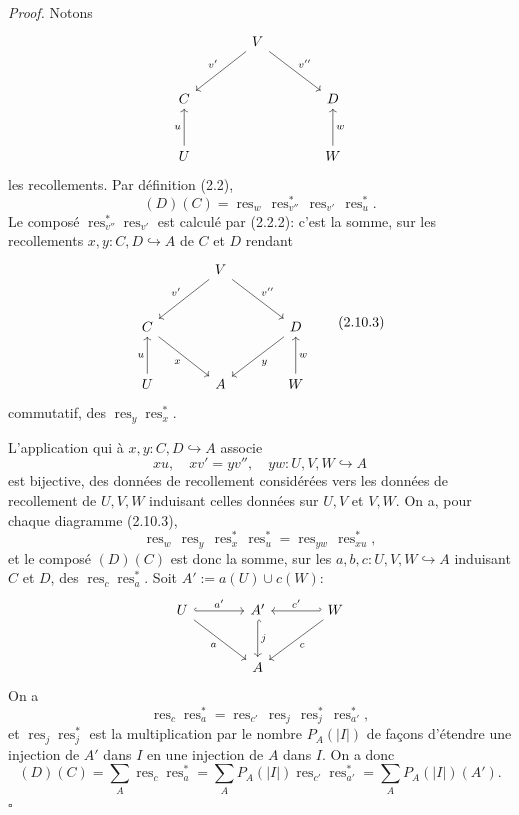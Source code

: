 \documentclass[11pt]{article}
\newcommand{\res}{\operatorname{res}}
\theoremstyle{deligne}
\newenvironment{proofdel}{\textit{Proof.}}{\hfill$\square$}
\begin{document}
\begin{proofdel}
Notons
\[
\begin{tikzcd}[column sep=large,row sep=large]
& V \arrow[dl,"v'"'] \arrow[dr,"v''"] &\\
C && D\\
U \arrow[u,"u"] && W \arrow[u,"w"']
\end{tikzcd}
\]
les recollements. Par définition (2.2),
\[
  (D)(C)=\res_w\,\res_{v''}^*\,\res_{v'}\,\res_u^*.
\]
Le composé \(\res_{v''}^*\res_{v'}\) est calculé par (2.2.2): c'est la somme, sur les recollements \(x,y:C,D\hookrightarrow A\) de \(C\) et \(D\) rendant
\[
\begin{tikzcd}[column sep=large,row sep=large]
& V \arrow[dl,"v'"'] \arrow[dr,"v''"] &\\
C \arrow[dr,"x"'] && D \arrow[dl,"y"]\\
U \arrow[u,"u"] & A & W \arrow[u,"w"']
\end{tikzcd}
\tag{2.10.3}
\]
commutatif, des \(\res_y\res_x^*\).

L'application qui à \(x,y:C,D\hookrightarrow A\) associe
\[
  xu,\quad xv'=yv'',\quad yw:U,V,W\hookrightarrow A
\]
est bijective, des données de recollement considérées vers les données de recollement de \(U,V,W\) induisant celles données sur \(U,V\) et \(V,W\). On a, pour chaque diagramme (2.10.3),
\[
  \res_w\,\res_y\,\res_x^*\,\res_u^*=\res_{yw}\,\res_{xu}^*,
\]
et le composé \((D)(C)\) est donc la somme, sur les \(a,b,c:U,V,W\hookrightarrow A\) induisant \(C\) et \(D\), des \(\res_c\res_a^*\). Soit \(A':=a(U)\cup c(W)\):
\[
\begin{tikzcd}[column sep=large,row sep=large]
U \arrow[r,hook,"a'"] \arrow[dr,"a"'] &
A' \arrow[d,hook,"j"] &
W \arrow[l,hook',"c'"'] \arrow[dl,"c"]\\
& A &
\end{tikzcd}
\]
On a
\[
  \res_c\res_a^*=\res_{c'}\,\res_j\,\res_j^*\,\res_{a'}^*,
\]
et \(\res_j\res_j^*\) est la multiplication par le nombre \(P_A(|I|)\) de façons d'étendre une injection de \(A'\) dans \(I\) en une injection de \(A\) dans \(I\). On a donc
\[
  (D)(C)=\sum_A\res_c\res_a^*
  =
  \sum_A P_A(|I|)\res_{c'}\res_{a'}^*
  =
  \sum_A P_A(|I|)(A').
\]
\end{proofdel}
\end{document}
